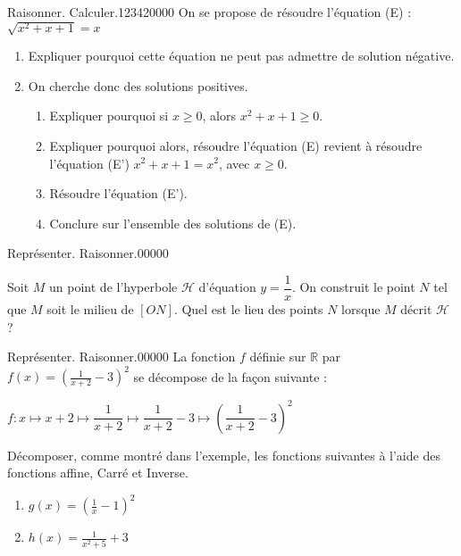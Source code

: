 \begin{pageParcourst} %

\begin{ExoCt}{Raisonner. Calculer.}{1234}{2}{0}{0}{0}{0}
On se propose de résoudre l'équation (E) : $\sqrt{x^2+x+1}=x$
\begin{enumerate}
\item Expliquer pourquoi cette équation ne peut pas admettre de solution négative. 
\item On cherche donc des solutions positives.
\begin{enumerate}
\item Expliquer pourquoi si $x \geq 0$, alors $x^2+x+1 \geq 0$.
\item Expliquer pourquoi alors, résoudre l'équation (E) revient à résoudre l'équation (E') $x^2+x+1=x^2$, avec $x \geq 0$.
\item Résoudre l'équation (E').
\item Conclure sur l'ensemble des solutions de (E).
\end{enumerate}
\end{enumerate}
\end{ExoCt}

\begin{ExoCtN}{Représenter. Raisonner.}{0}{0}{0}{0}{0}

Soit $M$ un point de l'hyperbole $\mathcal{H}$ d'équation $y=\dfrac{1}{x}$. On construit le point $N$ tel que $M$ soit le milieu de $[ON]$. Quel est le lieu des points $N$ lorsque $M$ décrit $\mathcal{H}$ ? 

\end{ExoCtN}

\begin{ExoCtN}{Représenter. Raisonner.}{0}{0}{0}{0}{0}
La fonction $f$ définie sur $\mathbb R$ par $f(x)=\left(\frac{1}{x+2}-3 \right)^2$ se décompose de la façon suivante :

$f:x \longmapsto  x+2 \mapsto  \dfrac{1}{x+2}   \longmapsto \dfrac{1}{x+2}-3 \longmapsto \left(\dfrac{1}{x+2}-3 \right)^2$


Décomposer, comme montré dans l'exemple, les fonctions suivantes à l'aide des fonctions affine, Carré et Inverse.
\begin{enumerate}
\item $g(x)=\left(\frac{1}{x}-1 \right)^2$ 

\item $h(x)=\frac{1}{x^2+5}+3$


\end{enumerate}
\end{ExoCtN}
\end{pageParcourst}
